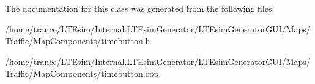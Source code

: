 The documentation for this class was generated from the following files\+:\begin{DoxyCompactItemize}
\item 
/home/trance/\+L\+T\+Esim/\+Internal.\+L\+T\+Esim\+Generator/\+L\+T\+Esim\+Generator\+G\+U\+I/\+Maps/\+Traffic/\+Map\+Components/timebutton.\+h\item 
/home/trance/\+L\+T\+Esim/\+Internal.\+L\+T\+Esim\+Generator/\+L\+T\+Esim\+Generator\+G\+U\+I/\+Maps/\+Traffic/\+Map\+Components/timebutton.\+cpp\end{DoxyCompactItemize}
